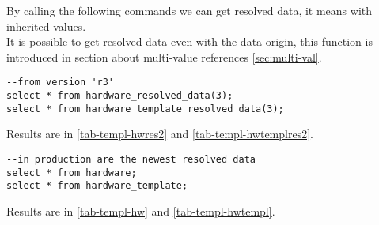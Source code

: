 \documentclass[deska]{subfiles}
\begin{document}
By calling the following commands we can get resolved data, it means with inherited values.\\
It is possible to get resolved data even with the data origin, this function is introduced in section about multi-value references \ref{sec:multi-val}.
\begin{verbatim}
--from version 'r3'
select * from hardware_resolved_data(3);
select * from hardware_template_resolved_data(3);
\end{verbatim}

Results are in \ref{tab-templ-hwres2} and \ref{tab-templ-hwtemplres2}.

\begin{verbatim}
--in production are the newest resolved data
select * from hardware;
select * from hardware_template;
\end{verbatim}
Results are in \ref{tab-templ-hw} and \ref{tab-templ-hwtempl}.
\end{document}
